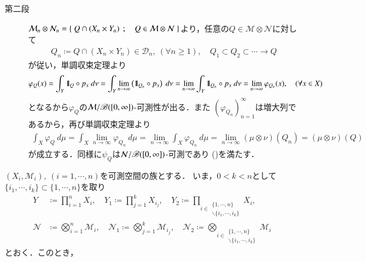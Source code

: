 \begin{prf}
\begin{description}
			\item[第二段]
				$\mathcal{M}_n \otimes \mathcal{N}_n = \left\{\ Q \cap (X_n \times Y_n)\ \, ; \quad Q \in \mathcal{M} \otimes \mathcal{N}\ \right\}$より，任意の$Q \in \mathcal{M} \otimes \mathcal{N}$に対して
				\begin{align}
					Q_n \coloneqq Q \cap (X_n \times Y_n) \in \mathcal{D}_n,
					\ (\forall n \geq 1),
					\quad Q_1 \subset Q_2 \subset \cdots \longrightarrow Q
				\end{align}
				が従い，単調収束定理より
				\begin{align}
					\varphi_Q(x) = \int_Y \mbox{1}\hspace{-0.25em}\mbox{l}_Q \circ p_x\ d\nu
					= \int_Y \lim_{n \to \infty} \left( \mbox{1}\hspace{-0.25em}\mbox{l}_{Q_n} \circ p_x \right)\ d\nu
					= \lim_{n \to \infty} \int_Y \mbox{1}\hspace{-0.25em}\mbox{l}_{Q_n} \circ p_x\ d\nu
					= \lim_{n \to \infty} \varphi_{Q_n}(x),
					\quad (\forall x \in X)
				\end{align}
				となるから$\varphi_Q$の$\mathcal{M}/\mathscr{B}([0,\infty])$-可測性が出る．また
				$\left( \varphi_{Q_n} \right)_{n=1}^\infty$は増大列であるから，再び単調収束定理より
				\begin{align}
					\int_X \varphi_Q\ d\mu
					= \int_X \lim_{n \to \infty} \varphi_{Q_n}\ d\mu
					= \lim_{n \to \infty} \int_X \varphi_{Q_n}\ d\mu
					= \lim_{n \to \infty} (\mu \otimes \nu)(Q_n)
					= (\mu \otimes \nu)(Q)
				\end{align}
				が成立する．同様に$\psi_Q$は$\mathcal{N}/\mathscr{B}([0,\infty])$-可測であり
				()を満たす．
				\QED
		\end{description}
	\end{prf}
	
	$(X_i,\mathcal{M}_i),\ (i=1,\cdots,n)$を可測空間の族とする．
	いま，$0 < k < n$として$\{i_1,\cdots,i_k\} \subset \{1,\cdots,n\}$を取り
	\begin{align}
		Y &\coloneqq \prod_{i=1}^n X_i,
		\quad Y_1 \coloneqq \prod_{j=1}^k X_{i_j},
		\quad Y_2 \coloneqq \prod_{i \in \substack{\{1,\cdots,n\} \\ \backslash \{i_1,\cdots,i_k\}}} X_i, \\
		\mathcal{N} &\coloneqq \bigotimes_{i=1}^n \mathcal{M}_i,
		\quad \mathcal{N}_1 \coloneqq \bigotimes_{j=1}^k \mathcal{M}_{i_j},
		\quad \mathcal{N}_2 \coloneqq \bigotimes_{i \in \substack{\{1,\cdots,n\} \\ \backslash \{i_1,\cdots,i_k\}}} \mathcal{M}_i
	\end{align}
	とおく．このとき，